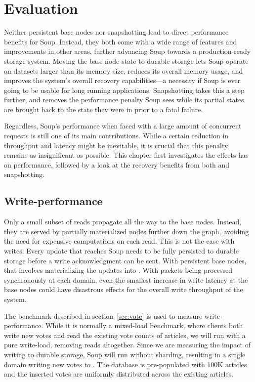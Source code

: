 \chapter{Evaluation}\label{chap:evaluation}

Neither persistent base nodes nor snapshotting lead to direct performance
benefits for Soup. Instead, they both come with a wide range of features and
improvements in other areas, further advancing Soup towards a production-ready
storage system. Moving the base node state to durable storage lets Soup operate
on datasets larger than its memory size, reduces its overall memory usage, and
improves the system's overall recovery capabilities---a necessity if Soup is
ever going to be usable for long running applications. Snapshotting takes this a
step further, and removes the performance penalty Soup sees while its partial
states are brought back to the state they were in prior to a fatal failure.

Regardless, Soup's performance when faced with a large amount of concurrent
requests is still one of its main contributions. While a certain reduction in
throughput and latency might be inevitable, it is crucial that this penalty
remains as insignificant as possible. This chapter first investigates the
effects  has on performance, followed by a look at the
recovery benefits from both  and snapshotting.

\newpage

\section{Write-performance}\label{sec:write-throughput}

Only a small subset of reads propagate all the way to the base nodes. Instead,
they are served by partially materialized nodes further down the graph, avoiding
the need for expensive computations on each read. This is not the case with
writes. Every update that reaches Soup needs to be fully persisted to durable
storage before a write acknowledgment can be sent. With persistent base nodes,
that involves materializing the updates into . With
packets being processed synchronously at each domain, even the smallest increase
in write latency at the base nodes could have disastrous effects for the overall
write throughput of the system.

The  benchmark described in section~\ref{sec:vote} is used to measure
write-performance. While it is normally a mixed-load benchmark, where clients
both write new votes and read the existing vote counts of articles, we will run
 with a pure write-load, removing reads altogether. Since we are
measuring the impact of writing to durable storage, Soup will run without
sharding, resulting in a single domain writing new votes to
. The database is pre-populated with 100K articles and the
inserted votes are uniformly distributed across the existing articles.

